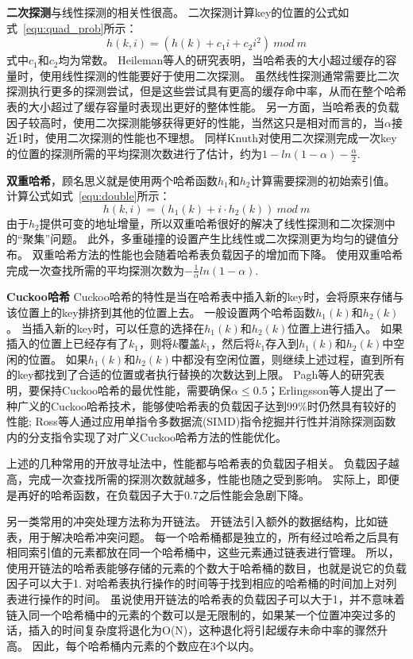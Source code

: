 \textbf{二次探测}与线性探测的相关性很高。
二次探测计算key的位置的公式如式~\ref{equ:quad_prob}所示：
\begin{equation}
h(k,i) = (h(k)+c_1 i+c_2i^2)~{mod}~m
\label{equ:quad_prob}
\end{equation}
式中$c_1$和$c_2$均为常数。
Heileman等人的研究表明，当哈希表的大小超过缓存的容量时，使用线性探测的性能要好于使用二次探测\cite{heileman2005caching}。
虽然线性探测通常需要比二次探测执行更多的探测尝试，但是这些尝试具有更高的缓存命中率，从而在整个哈希表的大小超过了缓存容量时表现出更好的整体性能。
另一方面，当哈希表的负载因子较高时，使用二次探测能够获得更好的性能，当然这只是相对而言的，当$\alpha$接近1时，使用二次探测的性能也不理想\cite{}。
同样Knuth对使用二次探测完成一次key的位置的探测所需的平均探测次数进行了估计，约为$1-ln(1-\alpha)-\frac{\alpha}{2}$.

\textbf{双重哈希}，顾名思义就是使用两个哈希函数$h_1$和$h_2$计算需要探测的初始索引值。
计算公式如式~\ref{equ:double}所示：
\begin{equation}
h(k,i) = (h_1(k)+i\cdot h_2(k)) ~{mod}~m
\label{equ:double}
\end{equation}
由于$h_2$提供可变的地址增量，所以双重哈希很好的解决了线性探测和二次探测中的“聚集”问题。
此外，多重碰撞的设置产生比线性或二次探测更为均匀的键值分布。
双重哈希方法的性能也会随着哈希表负载因子的增加而下降。
使用双重哈希完成一次查找所需的平均探测次数为$-\frac{1}{\alpha}ln(1-\alpha)$.

\textbf{Cuckoo哈希}
Cuckoo哈希的特性是当在哈希表中插入新的key时，会将原来存储与该位置上的key排挤到其他的位置上去。
一般设置两个哈希函数$h_1(k)$和$h_2(k)$。
当插入新的key时，可以任意的选择在$h_1(k)$和$h_2(k)$位置上进行插入。
如果插入的位置上已经存有了$k_1$，则将$k$覆盖$k_1$，然后将$k_1$存入到$h_1(k)$和$h_2(k)$中空闲的位置。
如果$h_1(k)$和$h_2(k)$中都没有空闲位置，则继续上述过程，直到所有的key都找到了合适的位置或者执行替换的次数达到上限\cite{pagh2004cuckoo,erlingsson2006cool}。
Pagh等人的研究表明，要保持Cuckoo哈希的最优性能，需要确保$\alpha\leq 0.5$\cite{pagh2004cuckoo}；Erlingsson等人提出了一种广义的Cuckoo哈希技术\cite{erlingsson2006cool}，能够使哈希表的负载因子达到99\%时仍然具有较好的性能;
Ross等人通过应用单指令多数据流(SIMD)指令挖掘并行性并消除探测函数内的分支指令实现了对广义Cuckoo哈希方法的性能优化\cite{ross2007efficient}。

上述的几种常用的开放寻址法中，性能都与哈希表的负载因子相关。
负载因子越高，完成一次查找所需的探测次数就越多，性能也随之受到影响。
实际上，即便是再好的哈希函数，在负载因子大于0.7之后性能会急剧下降。

另一类常用的冲突处理方法称为开链法。
开链法引入额外的数据结构，比如链表，用于解决哈希冲突问题。
每一个哈希桶都是独立的，所有经过哈希之后具有相同索引值的元素都放在同一个哈希桶中，这些元素通过链表进行管理。
所以，使用开链法的哈希表能够存储的元素的个数大于哈希桶的数目，也就是说它的负载因子可以大于1.
对哈希表执行操作的时间等于找到相应的哈希桶的时间加上对列表进行操作的时间。
虽说使用开链法的哈希表的负载因子可以大于1，并不意味着链入同一个哈希桶中的元素的个数可以是无限制的，如果某一个位置冲突过多的话，插入的时间复杂度将退化为O(N)，这种退化将引起缓存未命中率的骤然升高\cite{black1998graph}。
因此，每个哈希桶内元素的个数应在3个以内。

